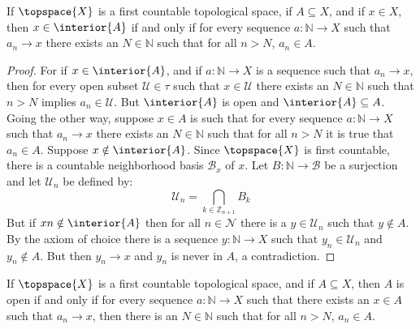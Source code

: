     \begin{theorem}
        If $\topspace{X}$ is a first countable topological space, if
        $A\subseteq{X}$, and if $x\in{X}$, then $x\in\interior{A}$ if and
        only if for every sequence $a:\mathbb{N}\rightarrow{X}$ such that
        $a_{n}\rightarrow{x}$ there exists an $N\in\mathbb{N}$ such that for
        all $n>N$, $a_{n}\in{A}$.
    \end{theorem}
    \begin{proof}
        For if $x\in\interior{A}$, and if $a:\mathbb{N}\rightarrow{X}$ is a
        sequence such that $a_{n}\rightarrow{x}$, then for every open subset
        $\mathcal{U}\in\tau$ such that $x\in\mathcal{U}$ there exists an
        $N\in\mathbb{N}$ such that $n>N$ implies $a_{n}\in\mathcal{U}$.
        But $\interior{A}$ is open and $\interior{A}\subseteq{A}$. Going the
        other way, suppose $x\in{A}$ is such that for every sequence
        $a:\mathbb{N}\rightarrow{X}$ such that $a_{n}\rightarrow{x}$ there
        exists an $N\in\mathbb{N}$ such that for all $n>N$ it is true that
        $a_{n}\in{A}$. Suppose $x\notin\interior{A}$. Since $\topspace{X}$
        is first countable, there is a countable neighborhood basis
        $\mathcal{B}_{x}$ of $x$. Let $B:\mathbb{N}\rightarrow\mathcal{B}$
        be a surjection and let $\mathcal{U}_{n}$ be defined by:
        \begin{equation}
            \mathcal{U}_{n}=\bigcap_{k\in\mathbb{Z}_{n+1}}B_{k}
        \end{equation}
        But if $xn\notin\interior{A}$ then for all $n\in\mathcal{N}$ there
        is a $y\in\mathcal{U}_{n}$ such that $y\notin{A}$. By the axiom of
        choice there is a sequence $y:\mathbb{N}\rightarrow{X}$ such that
        $y_{n}\in\mathcal{U}_{n}$ and $y_{n}\notin{A}$. But then
        $y_{n}\rightarrow{x}$ and $y_{n}$ is never in $A$, a contradiction.
    \end{proof}
    \begin{theorem}
        If $\topspace{X}$ is a first countable topological space, and if
        $A\subseteq{X}$, then $A$ is open if and only if for every sequence
        $a:\mathbb{N}\rightarrow{X}$ such that there exists an $x\in{A}$
        such that $a_{n}\rightarrow{x}$, then there is an $N\in\mathbb{N}$
        such that for all $n>N$, $a_{n}\in{A}$.
    \end{theorem}
